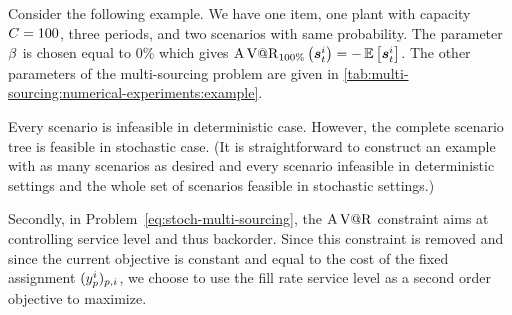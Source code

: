 Consider the following example.
We have one item, one plant with capacity $C=100$, three periods, and two scenarios with same probability.
The parameter $\beta$ is chosen equal to $0\%$ which gives $\AVaR_{100\%}\bracket{\va\inventory_t^i} = -\espe\sqbracket{\va\inventory_t^i}$.
The other parameters of the multi-sourcing problem are given in \cref{tab:multi-sourcing:numerical-experiments:example}.
\begin{table}[h]
\hfill
{}
\caption{Parameters of the counterexample}
\label{tab:multi-sourcing:numerical-experiments:example}
\end{table}
Every scenario is infeasible in deterministic case.
However, the complete scenario tree is feasible in stochastic case.
(It is straightforward to construct an example with as many scenarios as desired and every scenario infeasible in deterministic settings and the whole set of scenarios feasible in stochastic settings.)


Secondly, in Problem~\eqref{eq:stoch-multi-sourcing}, the $\operatorname{A\operatorname{V@R}}$ constraint aims at controlling service level and thus backorder.
Since this constraint is removed and since the current objective is constant and equal to the cost of the fixed assignment $(y_p^i)_{p,i}$, we choose to use the fill rate service level as a second order objective to maximize.






